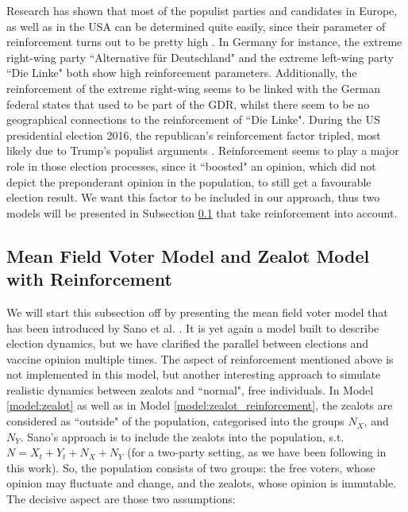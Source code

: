 \documentclass[12pt,a4paper,twoside]{article}
\begin{document}
Research has shown that most of the populist parties and candidates in Europe, as well as in the USA can be determined quite easily, since their parameter of reinforcement turns out to be pretty high \cite{JohannesMuller2020}. In Germany for instance, the extreme right-wing party ``Alternative für Deutschland" and the extreme left-wing party ``Die Linke" both show high reinforcement parameters. Additionally, the reinforcement of the extreme right-wing seems to be linked with the German federal states that used to be part of the \ac{GDR}, whilst there seem to be no geographical connections to the reinforcement of ``Die Linke". During the US presidential election 2016, the republican's reinforcement factor tripled, most likely due to Trump's populist arguments \cite{JohannesMuller2020}. Reinforcement seems to play a major role in those election processes, since it ``boosted" an opinion, which did not depict the preponderant opinion in the population, to still get a favourable election result. We want this factor to be included in our approach, thus two models will be presented in Subsection \ref{subsec:sano_zealot_reinforcement} that take reinforcement into account.\newline

\subsection{Mean Field Voter Model and Zealot Model with Reinforcement}\label{subsec:sano_zealot_reinforcement}
We will start this subsection off by presenting the mean field voter model that has been introduced by Sano et al. \cite{Sano07122017}. It is yet again a model built to describe election dynamics, but we have clarified the parallel between elections and vaccine opinion multiple times. The aspect of reinforcement mentioned above is not implemented in this model, but another interesting approach to simulate realistic dynamics between zealots and ``normal", free individuals. In Model \ref{model:zealot} as well as in Model \ref{model:zealot_reinforcement}, the zealots are considered as ``outside" of the population, categorised into the groups $N_X$, and $N_Y$. Sano's approach is to include the zealots into the population, s.t. $N = X_t + Y_t + N_X + N_Y$ (for a two-party setting, as we have been following in this work). So, the population consists of two groups: the free voters, whose opinion may fluctuate and change, and the zealots, whose opinion is immutable. The decisive aspect are those two assumptions:
\end{document}
